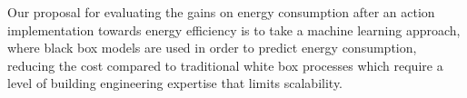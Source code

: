 \documentclass[3p,times,procedia]{elsarticle}
\begin{document}


Our proposal for evaluating the gains on energy consumption after an action implementation towards energy efficiency is to take a machine learning approach, where black box models are used in order to predict energy consumption, reducing the cost compared to traditional white box processes which require a level of building engineering expertise that limits scalability.









\end{document}
